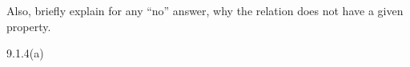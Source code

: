 \begin{questions}
Also, briefly explain for any ``no'' answer, why the relation does not have a given property. 
\fi 



\ifprintanswers 
 9.1.4(a) %

\end{questions}
